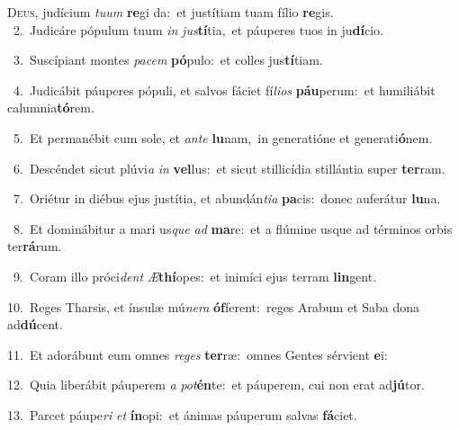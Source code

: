 \lettrine{\initial\textcolor{\initialcolor}{D}}{eus,} judícium \textit{tu}\-\textit{um} \textbf{re}\-gi da:~\star et justítiam tuam fílio \textbf{re}\-gis.\\
{\numbfont\textcolor{\numbcolor}{~2.}}~Judicáre pópulum tuum \textit{in} \textit{jus}\-\textbf{tí}tia,~\star et páuperes tuos in ju\-\textbf{dí}\-cio.\par
{\numbfont\textcolor{\numbcolor}{~3.}}~Suscípiant montes \textit{pa}\-\textit{cem} \textbf{pó}\-pulo:~\star et colles jus\-\textbf{tí}\-tiam.\par
{\numbfont\textcolor{\numbcolor}{~4.}}~Judicábit páuperes pópuli, et salvos fáciet fí\-\textit{li}\-\textit{os} \textbf{páu}\-perum:~\star et humiliábit calumnia\-\textbf{tó}\-rem.\par
{\numbfont\textcolor{\numbcolor}{~5.}}~Et permanébit cum sole, et \textit{an}\-\textit{te} \textbf{lu}\-nam,~\star in generatióne et generati\-\textbf{ó}\-nem.\par
{\numbfont\textcolor{\numbcolor}{~6.}}~Descéndet sicut plúvi\textit{a} \textit{in} \textbf{vel}\-lus:~\star et sicut stillicídia stillántia super \textbf{ter}\-ram.\par
{\numbfont\textcolor{\numbcolor}{~7.}}~Oriétur in diébus ejus justítia, et abundán\-\textit{ti}\-\textit{a} \textbf{pa}\-cis:~\star donec auferátur \textbf{lu}\-na.\par
{\numbfont\textcolor{\numbcolor}{~8.}}~Et dominábitur a mari us\textit{que} \textit{ad} \textbf{ma}\-re:~\star et a flúmine usque ad términos orbis ter\-\textbf{rá}\-rum.\par
{\numbfont\textcolor{\numbcolor}{~9.}}~Coram illo próci\textit{dent} \textit{Æ}\-\textbf{thí}opes:~\star et inimíci ejus terram \textbf{lin}\-gent.\par
{\numbfont\textcolor{\numbcolor}{10.}}~Reges Tharsis, et ínsulæ mú\-\textit{ne}\-\textit{ra} \textbf{óf}\-ferent:~\star reges Arabum et Saba dona ad\-\textbf{dú}\-cent.\par
{\numbfont\textcolor{\numbcolor}{11.}}~Et adorábunt eum omnes \textit{re}\-\textit{ges} \textbf{ter}\-ræ:~\star omnes Gentes sérvient \textbf{e}\-i:\par
{\numbfont\textcolor{\numbcolor}{12.}}~Quia liberábit páuperem \textit{a} \textit{pot}\-\textbf{én}te:~\star et páuperem, cui non erat ad\-\textbf{jú}\-tor.\par
{\numbfont\textcolor{\numbcolor}{13.}}~Parcet páupe\textit{ri} \textit{et} \textbf{ín}\-opi:~\star et ánimas páuperum salvas \textbf{fá}\-ciet.\par
